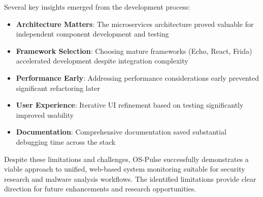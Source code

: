 Several key insights emerged from the development process:

\begin{itemize}
    \item \textbf{Architecture Matters}: The microservices architecture proved valuable for independent component development and testing
    \item \textbf{Framework Selection}: Choosing mature frameworks (Echo, React, Frida) accelerated development despite integration complexity
    \item \textbf{Performance Early}: Addressing performance considerations early prevented significant refactoring later
    \item \textbf{User Experience}: Iterative UI refinement based on testing significantly improved usability
    \item \textbf{Documentation}: Comprehensive documentation saved substantial debugging time across the stack
\end{itemize}

Despite these limitations and challenges, OS-Pulse successfully demonstrates a viable approach to unified, web-based system monitoring suitable for security research and malware analysis workflows. The identified limitations provide clear direction for future enhancements and research opportunities.
